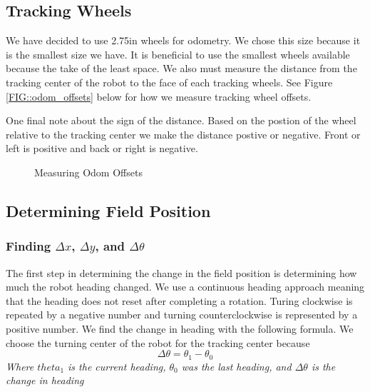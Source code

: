 \documentclass[12pt]{article}
\begin{document}
\subsection{Tracking Wheels}
We have decided to use 2.75in wheels for odometry. We chose this size because it is the smallest size we have. It is beneficial to use the smallest wheels available because the take of the least space. We also must measure the distance from the tracking center of the robot to the face of each tracking wheels. See Figure \ref{FIG::odom_offsets} below for how we measure tracking wheel offsets.

One final note about the sign of the distance. Based on the postion of the wheel relative to the tracking center we make the distance postive or negative. Front or left is positive and back or right is negative.

\def\wheelSize{1.5}
\begin{figure}[h]
 \caption{Measuring Odom Offsets}
 \label{FIG::odom_offsets}
 \centering
 \label{odom_offset_diagram}
\end{figure}


\pagebreak
\subsection{Determining Field Position}
\subsubsection{Finding $\Delta x$, $\Delta y$, and $\Delta\theta$}
The first step in determining the change in the field position is determining how much the robot heading changed. We use a continuous heading approach meaning that the heading does not reset after completing a rotation. Turing clockwise is repeated by a negative number and turning counterclockwise is represented by a positive number. We find the change in heading with the following formula. We choose the turning center of the robot for the tracking center because
$$
    \Delta \theta = \theta_1-\theta_0
$$
\textit{Where $theta_1$ is the current heading, $\theta_0$ was the last heading, and $\Delta \theta$ is the change in heading}
\end{document}
